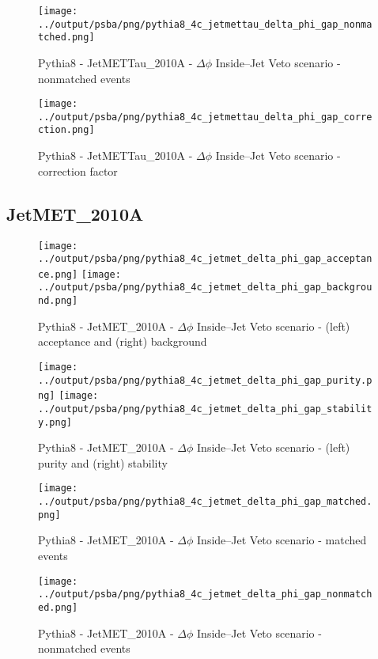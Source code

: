 \documentclass[11pt]{book}
\begin{document}
\begin{figure}[ht]
\centering
\texttt{[image: ../output/psba/png/pythia8\_4c\_jetmettau\_delta\_phi\_gap\_nonmatched.png]}
\caption{Pythia8 - JetMETTau\_2010A - $\Delta\phi$ Inside--Jet Veto scenario - nonmatched events}
\label{fig:p8_jetmettau_delta_phi_gap_nonmatched}
\end{figure}

\begin{figure}[ht]
\centering
\texttt{[image: ../output/psba/png/pythia8\_4c\_jetmettau\_delta\_phi\_gap\_correction.png]}
\caption{Pythia8 - JetMETTau\_2010A - $\Delta\phi$ Inside--Jet Veto scenario - correction factor}
\label{fig:p8_jetmettau_delta_phi_gap_correction}
\end{figure}


\clearpage
\subsection{JetMET\_2010A}

\begin{figure}[ht]
\centering
\texttt{[image: ../output/psba/png/pythia8\_4c\_jetmet\_delta\_phi\_gap\_acceptance.png]}
\texttt{[image: ../output/psba/png/pythia8\_4c\_jetmet\_delta\_phi\_gap\_background.png]}
\caption{Pythia8 - JetMET\_2010A - $\Delta\phi$ Inside--Jet Veto scenario - (left) acceptance and (right) background}
\label{fig:p8_jetmet_delta_phi_gap_ab}
\end{figure}

\begin{figure}[ht]
\centering
\texttt{[image: ../output/psba/png/pythia8\_4c\_jetmet\_delta\_phi\_gap\_purity.png]}
\texttt{[image: ../output/psba/png/pythia8\_4c\_jetmet\_delta\_phi\_gap\_stability.png]}
\caption{Pythia8 - JetMET\_2010A - $\Delta\phi$ Inside--Jet Veto scenario - (left) purity and (right) stability}
\label{fig:p8_jetmet_delta_phi_gap_ps}
\end{figure}

\begin{figure}[ht]
\centering
\texttt{[image: ../output/psba/png/pythia8\_4c\_jetmet\_delta\_phi\_gap\_matched.png]}
\caption{Pythia8 - JetMET\_2010A - $\Delta\phi$ Inside--Jet Veto scenario - matched events}
\label{fig:p8_jetmet_delta_phi_gap_matched}
\end{figure}

\begin{figure}[ht]
\centering
\texttt{[image: ../output/psba/png/pythia8\_4c\_jetmet\_delta\_phi\_gap\_nonmatched.png]}
\caption{Pythia8 - JetMET\_2010A - $\Delta\phi$ Inside--Jet Veto scenario - nonmatched events}
\label{fig:p8_jetmet_delta_phi_gap_nonmatched}
\end{figure}
\end{document}
